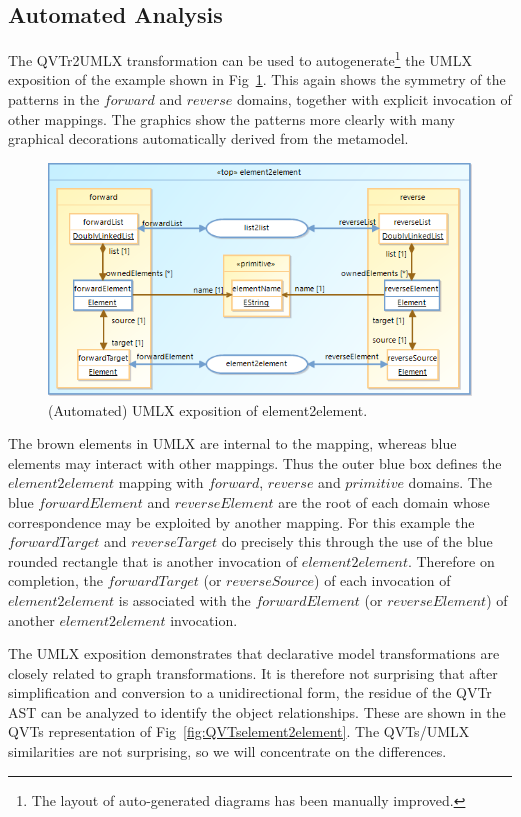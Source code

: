 \documentclass{llncs}
\begin{document}
\subsection{Automated Analysis}

The QVTr2UMLX transformation can be used to autogenerate\footnote{The layout of auto-generated diagrams has been manually improved.} the UMLX exposition of the example shown in Fig~\ref{fig:UMLXelement2element}. This again shows the symmetry of the patterns in the $forward$ and $reverse$ domains, together with explicit invocation of other mappings. The graphics show the patterns more clearly with many graphical decorations automatically derived from the metamodel.

\begin{figure}[h]
	\centering
	\includegraphics[width=1.0\textwidth]{UMLXelement2element.png}
	\caption{(Automated) UMLX exposition of element2element.}
	\label{fig:UMLXelement2element}
\end{figure}

The brown elements in UMLX are internal to the mapping, whereas blue elements may interact with other mappings. Thus the outer blue box defines the $element2element$ mapping with $forward$, $reverse$ and $primitive$ domains.  The blue $forwardElement$ and $reverseElement$ are the root of each domain whose correspondence may be exploited by another mapping. For this example the $forwardTarget$ and $reverseTarget$ do precisely this through the use of the blue rounded rectangle that is another invocation of $element2element$. Therefore on completion, the $forwardTarget$ (or $reverseSource$) of each invocation of $element2element$ is associated with the $forwardElement$ (or $reverseElement$) of another $element2element$ invocation.

The UMLX exposition demonstrates that declarative model transformations are closely related to graph transformations. It is therefore not surprising that after simplification and conversion to a unidirectional form, the residue of the QVTr AST can be analyzed to identify the object relationships. These are shown in the QVTs representation of Fig~\ref{fig:QVTselement2element}. The QVTs/UMLX similarities are not surprising, so we will concentrate on the differences. 
\end{document}
